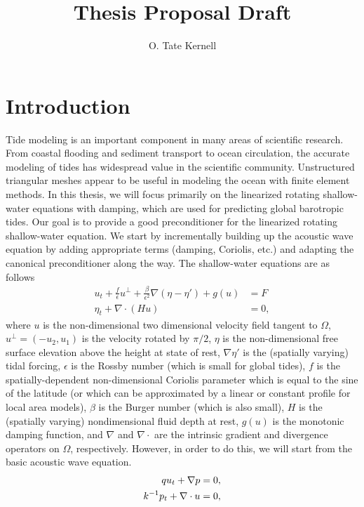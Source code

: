 \documentclass[11pt]{article}
\title{Thesis Proposal Draft}
\date{}
\author{O. Tate Kernell}
\begin{document}
\maketitle

\section{Introduction}
Tide modeling is an important component in many areas of scientific research. From coastal flooding and sediment transport to ocean circulation, the accurate modeling of tides has widespread value in the scientific community. Unstructured triangular meshes appear to be useful in modeling the ocean with finite element methods. In this thesis, we will focus primarily on the linearized rotating shallow-water equations with damping, which are used for predicting global barotropic tides. Our goal is to provide a good preconditioner for the linearized rotating shallow-water equation. We start by incrementally building up the acoustic wave equation by adding appropriate terms (damping, Coriolis, etc.) and adapting the canonical preconditioner along the way. The shallow-water equations are as follows
\begin{equation}
\begin{split}
u_t + \frac{f}{\epsilon}u^{\perp}+\frac{\beta}{\epsilon^2}\nabla(\eta - \eta')+g(u) &= F\\
\eta_t + \nabla \cdot (Hu) &= 0,
\end{split}
\end{equation}
where $u$ is the non-dimensional two dimensional velocity field tangent to $\Omega$, $u^\perp = (-u_2,u_1)$ is the velocity rotated by $\pi/2$, $\eta$ is the non-dimensional free surface elevation above the height at state of rest, $\nabla\eta'$ is the (spatially varying) tidal forcing, $\epsilon$ is the Rossby number (which is small for global tides), $f$ is the spatially-dependent non-dimensional Coriolis parameter which is equal to the sine of the latitude (or which can be approximated by a linear or constant profile for local area models), $\beta$ is the Burger number (which is also small), $H$ is the (spatially varying) nondimensional fluid depth at rest, $g(u)$ is the monotonic damping function, and $\nabla$ and $\nabla \cdot$ are the intrinsic gradient and divergence operators on $\Omega$, respectively. However, in order to do this, we will start from the basic acoustic wave equation.
\begin{equation}{\label{acouswave}}
\begin{split}
qu_t + \nabla p &= 0, \\
k^{-1}p_t+ \nabla \cdot u &= 0,
\end{split}
\end{equation}
\end{document}
